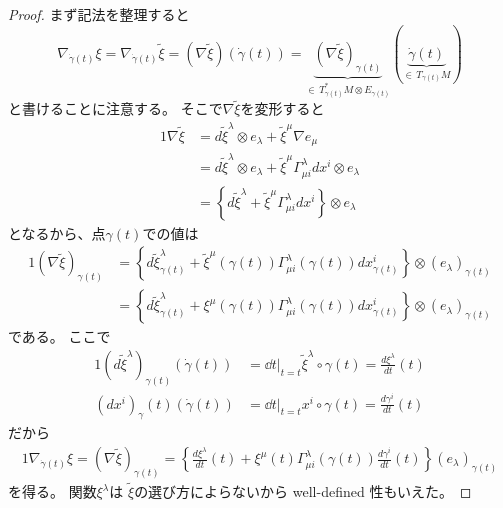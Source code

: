 \documentclass[report]{jlreq}
\begin{document}
\begin{proof}
    まず記法を整理すると
    \begin{equation}
        \nabla_{\dot{\gamma}(t)} \xi
            = \nabla_{\dot{\gamma}(t)} \widetilde{\xi}
            = (\nabla \widetilde{\xi}) (\dot{\gamma}(t))
            = \underbrace{
                (\nabla \widetilde{\xi})_{\gamma(t)}
            }_{\in \, T^*_{\gamma(t)} M \otimes E_{\gamma(t)}}
            (\underbrace{\dot{\gamma}(t)}_{\in \, T_{\gamma(t)} M})
    \end{equation}
    と書けることに注意する。
    そこで$\nabla \widetilde{\xi}$を変形すると
    \begin{alignat}{1}
        \nabla \widetilde{\xi}
            &= d\widetilde{\xi}^\lambda \otimes e_\lambda
                + \widetilde{\xi}^\mu \nabla e_\mu \\
            &= d\widetilde{\xi}^\lambda \otimes e_\lambda
                + \widetilde{\xi}^\mu \Gamma^\lambda_{\mu i} dx^i \otimes e_\lambda \\
            &= \left\{
                d\widetilde{\xi}^\lambda
                + \widetilde{\xi}^\mu \Gamma^\lambda_{\mu i} dx^i
            \right\} \otimes e_\lambda
    \end{alignat}
    となるから、点$\gamma(t)$での値は
    \begin{alignat}{1}
        (\nabla \widetilde{\xi})_{\gamma(t)}
            &= \left\{
                d\widetilde{\xi}^\lambda_{\gamma(t)}
                + \widetilde{\xi}^\mu (\gamma(t))
                \Gamma^\lambda_{\mu i} (\gamma(t))
                dx^i_{\gamma(t)}
            \right\} \otimes (e_\lambda)_{\gamma(t)} \\
            &= \left\{
                d\widetilde{\xi}^\lambda_{\gamma(t)}
                + \xi^\mu (\gamma(t))
                \Gamma^\lambda_{\mu i} (\gamma(t))
                dx^i_{\gamma(t)}
            \right\} \otimes (e_\lambda)_{\gamma(t)}
    \end{alignat}
    である。
    ここで
    \begin{alignat}{1}
        (d\widetilde{\xi}^\lambda)_{\gamma(t)} (\dot{\gamma}(t))
            &= \dd{t}\bigg|_{t = t} \widetilde{\xi}^\lambda \circ \gamma(t)
            = \frac{d\xi^\lambda}{dt}(t) \\
        (dx^i)_\gamma(t) (\dot{\gamma}(t))
            &= \dd{t}\bigg|_{t = t} x^i \circ \gamma(t)
            = \frac{d\gamma^i}{dt}(t)
    \end{alignat}
    だから
    \begin{alignat}{1}
        \nabla_{\dot{\gamma}(t)} \xi
            = (\nabla \widetilde{\xi})_{\gamma(t)}
            = \left\{
                \frac{d\xi^\lambda}{dt}(t)
                +
                \xi^\mu (t)
                \Gamma^\lambda_{\mu i} (\gamma(t))
                \frac{d\gamma^i}{dt}(t)
            \right\}
            (e_\lambda)_{\gamma(t)}
    \end{alignat}
    を得る。
    関数$\xi^\lambda$は
    $\widetilde{\xi}$の選び方によらないから
    well-defined 性もいえた。
\end{proof}
\end{document}
